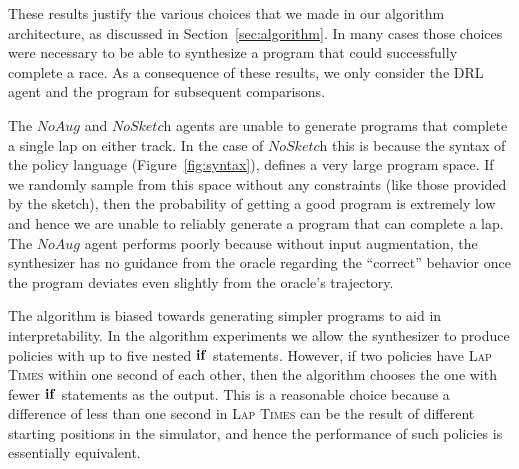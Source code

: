 These results justify the various choices that we made in our \algo algorithm architecture, as discussed in Section~\ref{sec:algorithm}. In many cases those choices were necessary to be able to synthesize a program that could successfully complete a race. As a consequence of these results, we only consider the DRL agent and the \algo program for subsequent comparisons.

The $\textit{NoAug}$ and $\textit{NoSketch}$ agents are unable to
generate programs that complete a single lap on either track. In the
case of $\textit{NoSketch}$ this is because the syntax of the policy
language (Figure~\ref{fig:syntax}), defines a very large program
space. If we randomly sample from this space without any constraints
(like those provided by the sketch), then the probability of getting a
good program is extremely low and hence we are unable to reliably
generate a program that can complete a lap. The $\textit{NoAug}$ agent
performs poorly because without input augmentation, the synthesizer
has no guidance from the oracle regarding the ``correct'' behavior once the program deviates even slightly from the oracle's trajectory.

The \algo algorithm is biased towards generating simpler programs to aid in interpretability. In the \algo algorithm experiments we allow the synthesizer to produce policies with up to five nested $\mathbf{if}$ statements. However, if two policies have \textsc{Lap Times} within one second of each other, then the algorithm chooses the one with fewer $\mathbf{if}$ statements as the output. This is a reasonable choice because a difference of less than one second in \textsc{Lap Times} can be the result of different starting positions in the \torcs simulator, and hence the performance of such policies is essentially equivalent.

